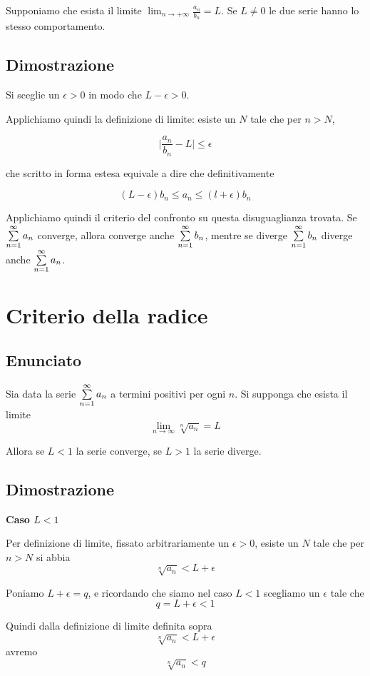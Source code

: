 Supponiamo che esista il limite $\lim_{n\to +\infty}\frac{a_n}{b_n}=L$. Se $L \neq 0$ le due serie hanno lo stesso comportamento.

\subsection{Dimostrazione}

Si sceglie un $\epsilon>0$ in modo che $L-\epsilon>0$. 

Applichiamo quindi la definizione di limite: esiste un $N$ tale che per $n > N$, 

$$\lvert \frac{a_n}{b_n} - L\rvert \leq \epsilon$$

che scritto in forma estesa equivale a dire che definitivamente

$$(L-\epsilon)b_n\leq a_n \leq (l+\epsilon)b_n$$

Applichiamo quindi il criterio del confronto su questa disuguaglianza trovata. Se $\sum\limits_{n=1}^{\infty} a_n$ converge, allora converge anche $\sum\limits_{n=1}^{\infty} b_n$, mentre se diverge $\sum\limits_{n=1}^{\infty} b_n$ diverge anche $\sum\limits_{n=1}^{\infty} a_n$.

\section{Criterio della radice}
\subsection{Enunciato}

Sia data la serie $\sum\limits_{n=1}^{\infty} a_n$ a termini positivi per ogni $n$. Si supponga che esista il limite $$\lim_{n \to \infty} \sqrt[n]{a_n} = L$$

Allora se $L<1$ la serie converge, se $L>1$ la serie diverge.


\subsection{Dimostrazione}

\textbf{Caso $L<1$}

Per definizione di limite, fissato arbitrariamente un $\epsilon>0$, esiste un $N$ tale che per $n>N$ si abbia $$\sqrt[n]{a_n} < L+\epsilon$$


Poniamo $L+\epsilon = q$, e ricordando che siamo nel caso $L<1$ scegliamo un $\epsilon$ tale che $$q = L+\epsilon < 1$$

Quindi dalla definizione di limite definita sopra $$\sqrt[n]{a_n} < L+\epsilon$$ avremo $$\sqrt[n]{a_n} < q$$

